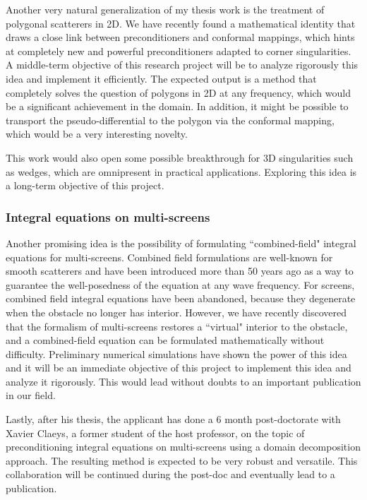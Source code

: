 \documentclass[]{article}
\begin{document}
Another very natural generalization of my thesis work is the treatment of polygonal scatterers in 2D. We have recently found a mathematical identity that draws a close link between preconditioners and conformal mappings, which hints at completely new and powerful preconditioners adapted to corner singularities. A middle-term objective of this research project will be to analyze rigorously this idea and implement it efficiently. The expected output is a method that completely solves the question of polygons in 2D at any frequency, which would be a significant achievement in the domain. In addition, it might be possible to transport the pseudo-differential to the polygon via the conformal mapping, which would be a very interesting novelty. 

This work would also open some possible breakthrough for 3D singularities such as wedges, which are omnipresent in practical applications. Exploring this idea is a long-term objective of this project.


\subsubsection*{Integral equations on multi-screens}

Another promising idea is the possibility of formulating ``combined-field" integral equations for multi-screens. Combined field formulations are well-known for smooth scatterers and have been introduced more than 50 years ago \cite{brakhage1965dirichletsehe} as a way to guarantee the well-posedness of the equation at any wave frequency. For screens, combined field integral equations have been abandoned, because they degenerate when the obstacle no longer has interior. 
However, we have recently discovered that the formalism of multi-screens restores a ``virtual" interior to the obstacle, and a combined-field equation can be formulated mathematically without difficulty. Preliminary numerical simulations have shown the power of this idea and it will be an immediate objective of this project to implement this idea and analyze it rigorously. This would lead without doubts to an important publication in our field. 

Lastly, after his thesis, the applicant has done a 6 month post-doctorate with Xavier Claeys, a former student of the host professor, on the topic of preconditioning integral equations on multi-screens using a domain decomposition approach. The resulting method is expected to be very robust and versatile. This collaboration will be continued during the post-doc and eventually lead to a publication. 
\end{document}
